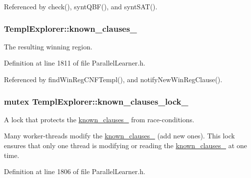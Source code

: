 Referenced by check(), synt\-Q\-B\-F(), and synt\-S\-A\-T().

\hypertarget{classTemplExplorer_af6b1ce533bff7ad2f4273e2cfc1ddc91}{
\subsubsection[{known\-\_\-clauses\-\_\-}]{ Templ\-Explorer\-::known\-\_\-clauses\-\_\-\hspace{0.3cm}{\ttfamily [protected]}}}\label{classTemplExplorer_af6b1ce533bff7ad2f4273e2cfc1ddc91}


The resulting winning region. 



Definition at line 1811 of file Parallel\-Learner.\-h.



Referenced by find\-Win\-Reg\-C\-N\-F\-Templ(), and notify\-New\-Win\-Reg\-Clause().

\hypertarget{classTemplExplorer_ae6051a12b617509a013318f60e51864b}{
\subsubsection[{known\-\_\-clauses\-\_\-lock\-\_\-}]{\setlength{\rightskip}{0pt plus 5cm}mutex Templ\-Explorer\-::known\-\_\-clauses\-\_\-lock\-\_\-\hspace{0.3cm}{\ttfamily [protected]}}}\label{classTemplExplorer_ae6051a12b617509a013318f60e51864b}


A lock that protects the \hyperlink{classTemplExplorer_af6b1ce533bff7ad2f4273e2cfc1ddc91}{known\-\_\-clauses\-\_\-} from race-\/conditions. 

Many worker-\/threads modify the \hyperlink{classTemplExplorer_af6b1ce533bff7ad2f4273e2cfc1ddc91}{known\-\_\-clauses\-\_\-} (add new ones). This lock ensures that only one thread is modifying or reading the \hyperlink{classTemplExplorer_af6b1ce533bff7ad2f4273e2cfc1ddc91}{known\-\_\-clauses\-\_\-} at one time. 

Definition at line 1806 of file Parallel\-Learner.\-h.




